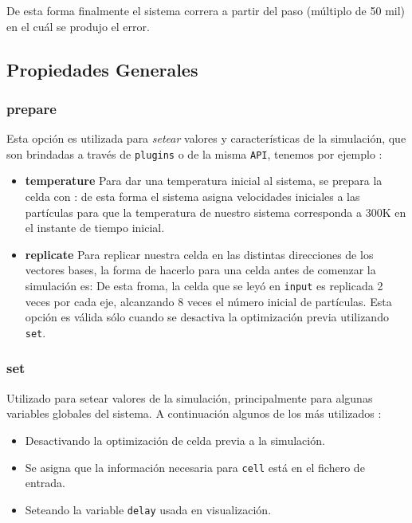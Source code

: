 
De esta forma finalmente el sistema correra a partir del paso (m\'ultiplo de 50 mil) en el cu\'al se produjo el error.

\subsection{Propiedades Generales}
\subsubsection{prepare}
Esta opci\'on es utilizada para \textit{setear} valores y caracter\'isticas de la simulaci\'on, que son brindadas a trav\'es de \verb|plugins| o de la misma \verb|API|, tenemos por ejemplo :

\begin{itemize}
 \item \textbf{temperature}
Para dar una temperatura inicial al sistema, se prepara la celda con :
de esta forma el sistema asigna velocidades iniciales a las part\'iculas para que la temperatura de nuestro sistema corresponda a 300K en el instante de tiempo inicial.
 \item \textbf{replicate}
Para replicar nuestra celda en las distintas direcciones de los vectores bases, la forma de hacerlo para una celda antes de comenzar la simulaci\'on es:
De esta froma, la celda que se ley\'o en \verb|input| es replicada 2 veces por cada eje, alcanzando 8 veces el n\'umero inicial de part\'iculas. Esta opci\'on es v\'alida s\'olo cuando se desactiva la optimizaci\'on previa utilizando \verb|set|.
\end{itemize}

\subsubsection{set}
Utilizado para setear valores de la simulaci\'on, principalmente para algunas variables globales del sistema. A continuaci\'on algunos de los m\'as utilizados :

\begin{itemize}
 \item Desactivando la optimizaci\'on de celda previa a la simulaci\'on.
 \item Se asigna que la informaci\'on necesaria para \texttt{cell} est\'a en el fichero de entrada.
 \item Seteando la variable \texttt{delay} usada en visualizaci\'on.
\end{itemize}

